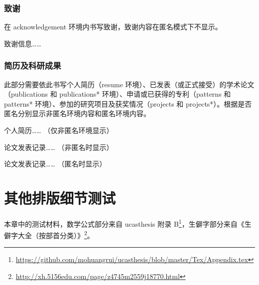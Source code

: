 \documentclass[bachelor, comfort]{shtthesis}
\begin{document}
\subsection{致谢}
在 acknowledgement 环境内书写致谢，致谢内容在匿名模式下不显示。
\begin{latex}
\begin{acknowledgement}
  致谢信息……
\end{acknowledgement}
\end{latex}

\subsection{简历及科研成果}
此部分需要依此书写个人简历（resume 环境）、已发表（或正式接受）的学术论文（publications 和 publications* 环境）、申请或已获得的专利（patterns 和 patterns* 环境）、参加的研究项目及获奖情况（projects 和 projects*）。根据是否匿名分别显示非匿名环境内容和匿名环境内容。
\begin{latex}
\begin{resume}
  个人简历…… （仅非匿名环境显示）
\end{resume}

\begin{publications}
  论文发表记录…… （非匿名时显示）
\end{publications}

\begin{publications*}
  论文发表记录…… （匿名时显示）
\end{publications*}
\end{latex}

\makebiblio

\appendix
\chapter{其他排版细节测试}
本章中的测试材料，数学公式部分来自 \textsf{ucasthesis} 附录 B\footnote{\url{https://github.com/mohuangrui/ucasthesis/blob/master/Tex/Appendix.tex}}，生僻字部分来自《生僻字大全（按部首分类）》\footnote{\url{http://xh.5156edu.com/page/z4745m2559j18770.html}}。
\end{document}
